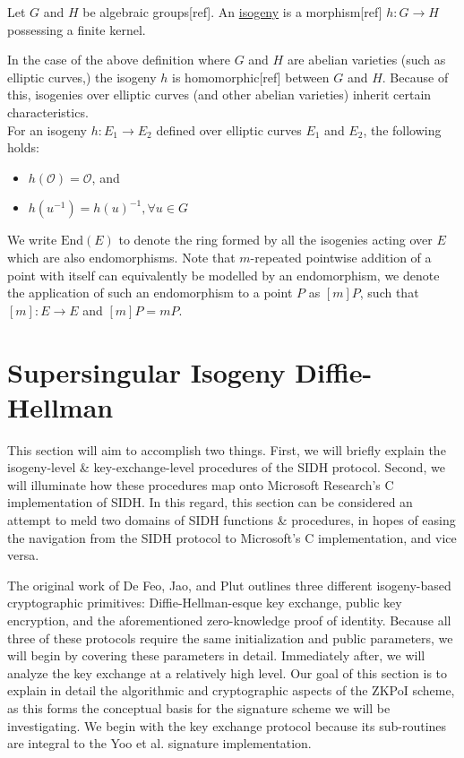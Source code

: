 \begin{tcolorbox}
\begin{definition}[Isogeny]
\label{defn:isogeny}
Let $G$ and $H$ be algebraic groups[ref]. An \underline{isogeny} is a morphism[ref] $h: G \rightarrow H$ possessing a finite kernel.
\end{definition}
\end{tcolorbox}

In the case of the above definition where $G$ and $H$ are abelian varieties (such as elliptic curves,) the isogeny $h$ is homomorphic[ref] between $G$ and $H$. Because of this, isogenies over elliptic curves (and other abelian varieties) inherit certain characteristics.\\
For an isogeny $h: E_{1} \rightarrow E_{2}$ defined over elliptic curves $E_1$ and $E_2$, the following holds:
\begin{itemize}
\item $h(\mathcal{O}) = \mathcal{O}$, and
\item $h(u^{-1}) = h(u)^{-1}, \forall u \in G$
\end{itemize}

We write $\text{End}(E)$ to denote the ring formed by all the isogenies acting over $E$ which are also endomorphisms. Note that $m$-repeated pointwise addition of a point with itself can equivalently be modelled by an endomorphism, we denote the application of such an endomorphism to a point $P$ as $[m]P$, such that $[m]: E \rightarrow E$ and $[m]P = mP$.

\section{Supersingular Isogeny Diffie-Hellman}

This section will aim to accomplish two things. First, we will briefly explain the isogeny-level \& key-exchange-level procedures of the SIDH protocol. Second, we will illuminate how these procedures map onto Microsoft Research's C implementation of SIDH. In this regard, this section can be considered an attempt to meld two domains of SIDH functions \& procedures, in hopes of easing the navigation from the SIDH protocol to Microsoft's C implementation, and vice versa.

The original work of De Feo, Jao, and Plut outlines three different isogeny-based cryptographic primitives: Diffie-Hellman-esque key exchange, public key encryption, and the aforementioned zero-knowledge proof of identity. Because all three of these protocols require the same initialization and public parameters, we will begin by covering these parameters in detail. Immediately after, we will analyze the key exchange at a relatively high level. Our goal of this section is to explain in detail the algorithmic and cryptographic aspects of the ZKPoI scheme, as this forms the conceptual basis for the signature scheme we will be investigating. We begin with the key exchange protocol because its sub-routines are integral to the Yoo et al. signature implementation.

